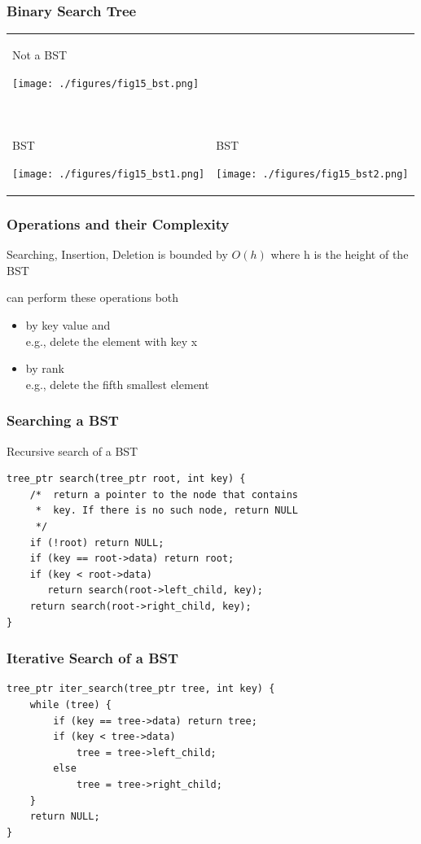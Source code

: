 \documentclass[newPxFont,sthlmFooter,nooffset]{beamer}
\begin{document}
\begin{frame}[t]
  \frametitle{Binary Search Tree}
  \begin{tabular}{p{} p{}}
Not a BST

    \texttt{[image: ./figures/fig15\_bst.png]}
&   ~\\
~& ~\\
BST

    \texttt{[image: ./figures/fig15\_bst1.png]}
&
BST

    \texttt{[image: ./figures/fig15\_bst2.png]}
\\
  \end{tabular}
\end{frame}


\begin{frame}[t]
  \frametitle{Operations and their Complexity}
Searching, Insertion, Deletion is bounded by $O(h)$ where h is the height of the BST

can perform these operations both
\begin{itemize}
\item by key value and\\
      e.g., delete the element with key x
\item by rank\\
      e.g., delete the fifth smallest element
\end{itemize}
\end{frame}





\begin{frame}[t, fragile]
  \frametitle{Searching a BST}

Recursive search of a BST
  \begin{lstlisting}
tree_ptr search(tree_ptr root, int key) { 
    /*  return a pointer to the node that contains
     *  key. If there is no such node, return NULL 
     */
    if (!root) return NULL;
    if (key == root->data) return root; 
    if (key < root->data) 
       return search(root->left_child, key); 
    return search(root->right_child, key);    
}
  \end{lstlisting}
\end{frame}


\begin{frame}[t, fragile]
  \frametitle{Iterative Search of a BST}
  \begin{lstlisting}
tree_ptr iter_search(tree_ptr tree, int key) {
    while (tree) {
        if (key == tree->data) return tree; 
        if (key < tree->data)
            tree = tree->left_child; 
        else
            tree = tree->right_child; 
    }
    return NULL; 
}    
  \end{lstlisting}
\end{frame}
\end{document}
